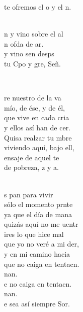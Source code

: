 \documentclass[12pt]{article}
\begin{document}
\begin{multicols*}{2}
\begin{cancion}
	te ofremos el o y el n. \\\jump\\
	\begin{chorus}%
	n y vino sobre el al\\
	n ofda de ar.\\
	 y vino sen desps \\
	tu Cpo y gre, Señ. \\
	\end{chorus}%
	\jump\\
\end{cancion}%

\begin{cancion}%
	re nuestro de la va\\
	mío, de ése, y de él,\\
	que vive en cada cria\\
	y ellos así han de cer.\\
\jump
	Quisa realzar tu mbre\\
	viviendo aquí, bajo ell,\\
	ensaje de aquel te\\
	de pobreza, z y a.\\\jump\\
	\begin{chorus}%
	s pan para vivir\\
	sólo el momento prnte\\
	ya que el día de mana \\
	quizás aquí no me uentr\\
	ires lo que hice mal\\
	que yo no veré a mi der,\\
	y en mi camino hacia \\
	que no caiga en tentacn.\\
	nan.\\
	e no caiga en tentacn.\\
	nan.\\
	e sea así siempre Sor.\\
	\end{chorus}%
	\jump\\
\end{cancion}%


\end{multicols*}
\end{document}
